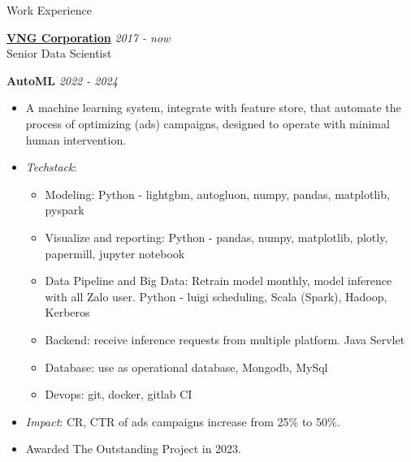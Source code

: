 \documentclass{resume} %
\begin{document}
\begin{rSection}{Work Experience}

{\bf \underline{VNG Corporation}} \hfill {\em 2017 - now}
\\Senior Data Scientist

\textbf{AutoML} \hfill {\em \textit{2022 - 2024}}
\begin{itemize}
    \item A machine learning system, integrate with feature store, that automate the process of optimizing (ads) campaigns, designed to operate with minimal human intervention.
    \item \textit{Techstack}:
    \begin{itemize}
        \item Modeling: Python - lightgbm, autogluon, numpy, pandas, matplotlib, pyspark
        \item Visualize and reporting: Python - pandas, numpy, matplotlib, plotly, papermill, jupyter notebook
        \item Data Pipeline and Big Data: Retrain model monthly,  model inference with all Zalo user. Python - luigi scheduling, Scala (Spark), Hadoop, Kerberos
        \item Backend: receive inference requests from multiple platform. Java Servlet
        \item Database: use as operational database, Mongodb, MySql
        \item Devops: git, docker, gitlab CI
    \end{itemize} 
    \item \textit{Impact}: CR, CTR of ads campaigns increase from 25\% to 50\%. 
    \item Awarded The Outstanding Project in 2023.
\end{itemize}



\end{rSection}
\end{document}
